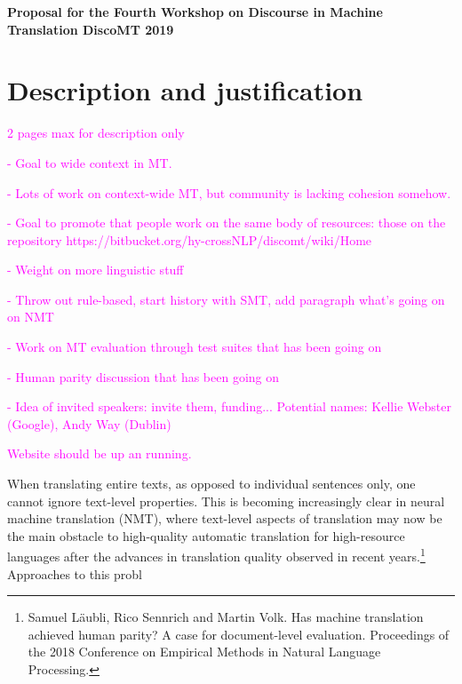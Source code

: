 \documentclass[11pt]{article}
\begin{document}
\begin{center}
\Large{\textbf{Proposal for the Fourth Workshop on Discourse in Machine Translation DiscoMT 2019}}
\end{center}

\section{Description and justification}

\textcolor{magenta}{2 pages max for description only}

\textcolor{magenta}{- Goal to wide context in MT.} 

\textcolor{magenta}{- Lots of work on context-wide MT, but community is lacking cohesion somehow.}

\textcolor{magenta}{- Goal to promote that people work on the same body of resources: those on the repository https://bitbucket.org/hy-crossNLP/discomt/wiki/Home } 

\textcolor{magenta}{- Weight on more linguistic stuff}

\textcolor{magenta}{- Throw out rule-based, start history with SMT, add paragraph what's going on on NMT}

\textcolor{magenta}{- Work on MT evaluation through test suites that has been going on}

\textcolor{magenta}{- Human parity discussion that has been going on }

\textcolor{magenta}{- Idea of invited speakers: invite them, funding... Potential names: Kellie Webster (Google), Andy Way (Dublin)}

\textcolor{magenta}{Website should be up an running. }

When translating entire texts, as opposed to individual sentences only, 
one cannot ignore text-level properties. This is becoming increasingly
clear in neural machine translation (NMT), where text-level aspects of
translation may now be the main obstacle to high-quality automatic
translation for high-resource languages after the advances in translation
quality observed in recent years.\footnote{Samuel Läubli, Rico Sennrich
and Martin Volk. Has machine translation achieved human parity? A case
for document-level evaluation. Proceedings of the 2018 Conference on
Empirical Methods in Natural Language Processing.} Approaches to this
probl
\end{document}
